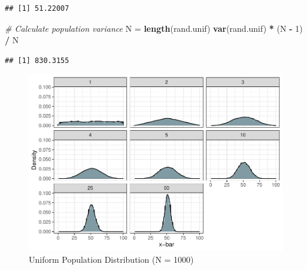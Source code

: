 \documentclass[]{book}
\newenvironment{Shaded}{\begin{snugshade}}{\end{snugshade}}
\newcommand{\CommentTok}[1]{\textcolor[rgb]{0.56,0.35,0.01}{\textit{#1}}}
\newcommand{\DataTypeTok}[1]{\textcolor[rgb]{0.13,0.29,0.53}{#1}}
\newcommand{\DecValTok}[1]{\textcolor[rgb]{0.00,0.00,0.81}{#1}}
\newcommand{\FloatTok}[1]{\textcolor[rgb]{0.00,0.00,0.81}{#1}}
\newcommand{\KeywordTok}[1]{\textcolor[rgb]{0.13,0.29,0.53}{\textbf{#1}}}
\newcommand{\NormalTok}[1]{#1}
\newcommand{\OperatorTok}[1]{\textcolor[rgb]{0.81,0.36,0.00}{\textbf{#1}}}
\newcommand{\StringTok}[1]{\textcolor[rgb]{0.31,0.60,0.02}{#1}}
\begin{document}
\begin{verbatim}
## [1] 51.22007
\end{verbatim}

\begin{Shaded}
\begin{Highlighting}[]
\CommentTok{# Calculate population variance}
\NormalTok{N =}\StringTok{ }\KeywordTok{length}\NormalTok{(rand.unif)}
\KeywordTok{var}\NormalTok{(rand.unif) }\OperatorTok{*}\StringTok{ }\NormalTok{(N }\OperatorTok{-}\StringTok{ }\DecValTok{1}\NormalTok{) }\OperatorTok{/}\StringTok{ }\NormalTok{N}
\end{Highlighting}
\end{Shaded}

\begin{verbatim}
## [1] 830.3155
\end{verbatim}

\begin{Shaded}
\end{Shaded}

\begin{figure}

{\centering \includegraphics{_main_files/figure-latex/unnamed-chunk-38-1} 

}

\caption{Uniform Population Distribution (N = 1000)}\label{fig:unnamed-chunk-38}
\end{figure}
\end{document}
